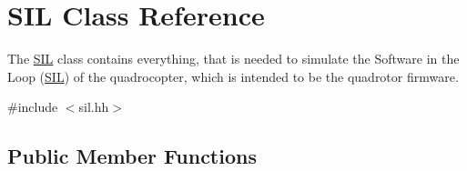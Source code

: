 \hypertarget{classSIL}{\section{\-S\-I\-L \-Class \-Reference}
\label{classSIL}
}


\-The \hyperlink{classSIL}{\-S\-I\-L} class contains everything, that is needed to simulate the \-Software in the \-Loop (\hyperlink{classSIL}{\-S\-I\-L}) of the quadrocopter, which is intended to be the quadrotor firmware.  




{\ttfamily \#include $<$sil.\-hh$>$}

\subsection*{\-Public \-Member \-Functions}
